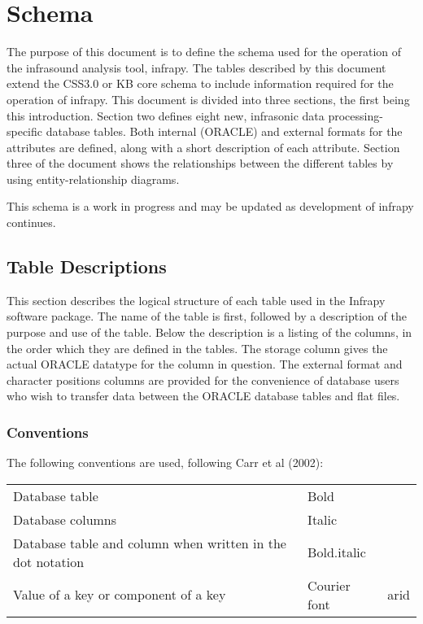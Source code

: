 \documentclass[letterpaper,10pt,english]{sphinxmanual}
\begin{document}
\section{Schema}
\label{\detokenize{schema:schema}}\label{\detokenize{schema:id1}}\label{\detokenize{schema::doc}}
The purpose of this document is to define the schema used for the
operation of the infrasound analysis tool, infrapy. The tables described
by this document extend the CSS3.0 or KB core schema to include
information required for the operation of infrapy. This document is
divided into three sections, the first being this introduction. Section
two defines eight new, infrasonic data processing-specific database
tables. Both internal (ORACLE) and external formats for the attributes
are defined, along with a short description of each attribute. Section
three of the document shows the relationships between the different
tables by using entity-relationship diagrams.

This schema is a work in progress and may be updated as development of
infrapy continues.


\subsection{Table Descriptions}
\label{\detokenize{schema:table-descriptions}}
This section describes the logical structure of each table used in the
Infrapy software package. The name of the table is first, followed by a
description of the purpose and use of the table. Below the description
is a listing of the columns, in the order which they are defined in the
tables. The storage column gives the actual ORACLE datatype for the
column in question. The external format and character positions columns
are provided for the convenience of database users who wish to transfer
data between the ORACLE database tables and flat files.


\subsubsection{Conventions}
\label{\detokenize{schema:conventions}}
The following conventions are used, following Carr et al (2002):


\begin{savenotes}\sphinxattablestart
\centering
\begin{tabulary}{\linewidth}[t]{|T|T|T|}
\hline
\sphinxstyletheadfamily 
{}
&\sphinxstyletheadfamily 
{}
&\sphinxstyletheadfamily 
{}
\\
\hline
Database table
&
Bold
&
\\
\hline
Database columns
&
Italic
&
\\
\hline
Database table and
column when written
in the dot notation
&
Bold.italic
&
\\
\hline
Value of a key or
component of a key
&
Courier font
&
arid
\\
\hline
\end{tabulary}
\par
\sphinxattableend\end{savenotes}
\end{document}
